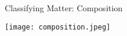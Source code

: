 \documentclass[notes=show]{beamer}
\begin{document}
\begin{frame}{Classifying Matter: Composition}
	\begin{center}
		\texttt{[image: composition.jpeg]}
	\end{center}
%
%
%
%
%
\end{frame}
\end{document}
